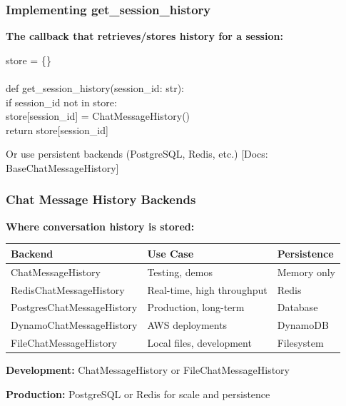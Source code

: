 \documentclass[aspectratio=169,11pt]{beamer}
\newcommand{\docref}[1]{{\scriptsize\color{docgray}[Docs: #1]}}
\begin{document}
\begin{frame}
  \frametitle{Implementing get\_session\_history}
  \textbf{The callback that retrieves/stores history for a session:}
  \vspace{0.6em}
  \begin{codebox}
    \ttfamily\small
    store = \{\} \\
    \\
    def get\_session\_history(session\_id: str): \\
    \hspace{2em} if session\_id not in store: \\
    \hspace{4em} store[session\_id] = ChatMessageHistory() \\
    \hspace{2em} return store[session\_id]
  \end{codebox}
  \vspace{0.6em}
  Or use persistent backends (PostgreSQL, Redis, etc.)
  \docref{BaseChatMessageHistory}
\end{frame}

\begin{frame}
  \frametitle{Chat Message History Backends}
  \textbf{Where conversation history is stored:}
  \vspace{0.6em}
  \begin{tabular}{|l|l|l|}
    \hline
    \textbf{Backend} & \textbf{Use Case} & \textbf{Persistence} \\
    \hline
    ChatMessageHistory & Testing, demos & Memory only \\
    \hline
    RedisChatMessageHistory & Real-time, high throughput & Redis \\
    \hline
    PostgresChatMessageHistory & Production, long-term & Database \\
    \hline
    DynamoChatMessageHistory & AWS deployments & DynamoDB \\
    \hline
    FileChatMessageHistory & Local files, development & Filesystem \\
    \hline
  \end{tabular}
  \vspace{0.6em}
  \begin{tipbox}
    \textbf{Development:} ChatMessageHistory or FileChatMessageHistory

    \textbf{Production:} PostgreSQL or Redis for scale and persistence
  \end{tipbox}
\end{frame}
\end{document}
